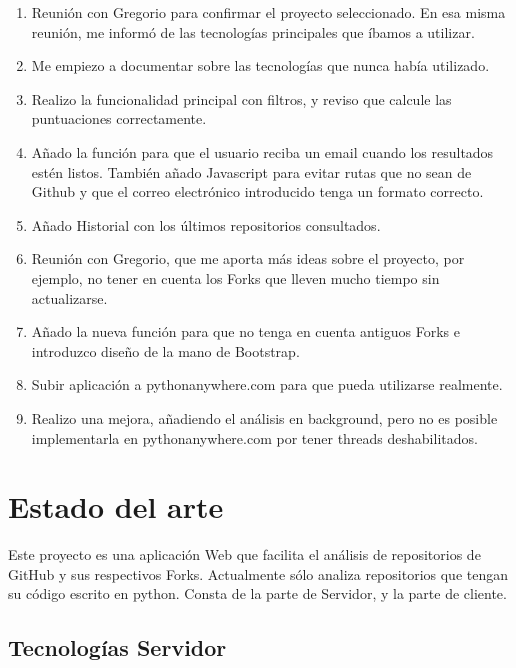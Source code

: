 \documentclass[a4paper, 12pt]{book}
\begin{document}
\begin{enumerate}
\item Reunión con Gregorio para confirmar el proyecto seleccionado. En esa misma reunión, me informó de las tecnologías principales que íbamos a utilizar.
\item Me empiezo a documentar sobre las tecnologías que nunca había utilizado.
\item Realizo la funcionalidad principal con filtros, y reviso que calcule las puntuaciones correctamente.
\item Añado la función para que el usuario reciba un email cuando los resultados estén listos. También añado Javascript para evitar rutas que no sean de Github y que el correo electrónico introducido tenga un formato correcto.
\item Añado Historial con los últimos repositorios consultados.
\item Reunión con Gregorio, que me aporta más ideas sobre el proyecto, por ejemplo, no tener en cuenta los Forks que lleven mucho tiempo sin actualizarse.
\item Añado la nueva función para que no tenga en cuenta antiguos Forks e introduzco diseño de la mano de Bootstrap.
\item Subir aplicación a pythonanywhere.com para que pueda utilizarse realmente.
\item Realizo una mejora, añadiendo el análisis en background, pero no es posible implementarla en pythonanywhere.com por tener threads deshabilitados.
\end{enumerate}



\cleardoublepage
\chapter{Estado del arte}

Este proyecto es una aplicación Web que facilita el análisis de repositorios de GitHub y sus respectivos Forks. 
Actualmente sólo analiza repositorios que tengan su código escrito en python.
Consta de la parte de Servidor, y la parte de cliente.


\section{Tecnologías Servidor} 
\label{sec:seccion1}
\end{document}
